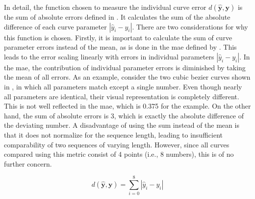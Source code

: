 In detail, the function chosen to measure the individual curve error $d(\hat{\mathbf{y}},\mathbf{y})$ is the sum of absolute errors defined in . It calculates the sum of the absolute difference of each curve parameter $|\hat{y}_i - y_i|$. There are two considerations for why this function is chosen. Firstly, it is important to calculate the sum of curve parameter errors instead of the mean, as is done in the \gls{mae} defined by . This leads to the error scaling linearly with errors in individual parameters $|\hat{y}_i - y_i|$. In the \gls{mae}, the contribution of individual parameter errors is diminished by taking the mean of all errors. As an example, consider the two cubic bezier curves shown in , in which all parameters match except a single number. Even though nearly all parameters are identical, their visual representation is completely different. This is not well reflected in the \gls{mae}, which is 0.375 for the example. On the other hand, the sum of absolute errors is 3, which is exactly the absolute difference of the deviating number. A disadvantage of using the sum instead of the mean is that it does not normalize for the sequence length, leading to insufficient comparability of two sequences of varying length. However, since all curves compared using this metric consist of 4 points (i.e., 8 numbers), this is of no further concern.

\begin{equation}
\label{eq:sae}
    d(\hat{\mathbf{y}},\mathbf{y})= \sum_{i=0}^8 |\hat{y}_i - y_i|
\end{equation}

